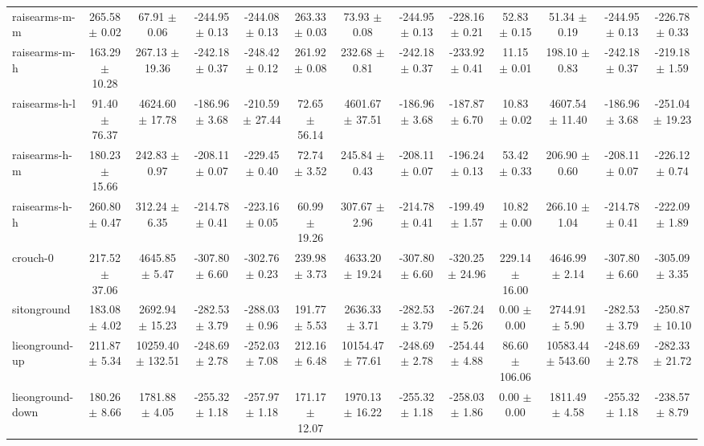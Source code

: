 \begin{tabular}{|lcccccccccccc|}
raisearms-m-m & 265.58 $\pm$ 0.02 & 67.91 $\pm$ 0.06 & -244.95 $\pm$ 0.13 & -244.08 $\pm$ 0.13 & 263.33 $\pm$ 0.03 & 73.93 $\pm$ 0.08 & -244.95 $\pm$ 0.13 & -228.16 $\pm$ 0.21 & 52.83 $\pm$ 0.15 & 51.34 $\pm$ 0.19 & -244.95 $\pm$ 0.13 & -226.78 $\pm$ 0.33 \\
raisearms-m-h & 163.29 $\pm$ 10.28 & 267.13 $\pm$ 19.36 & -242.18 $\pm$ 0.37 & -248.42 $\pm$ 0.12 & 261.92 $\pm$ 0.08 & 232.68 $\pm$ 0.81 & -242.18 $\pm$ 0.37 & -233.92 $\pm$ 0.41 & 11.15 $\pm$ 0.01 & 198.10 $\pm$ 0.83 & -242.18 $\pm$ 0.37 & -219.18 $\pm$ 1.59 \\
raisearms-h-l & 91.40 $\pm$ 76.37 & 4624.60 $\pm$ 17.78 & -186.96 $\pm$ 3.68 & -210.59 $\pm$ 27.44 & 72.65 $\pm$ 56.14 & 4601.67 $\pm$ 37.51 & -186.96 $\pm$ 3.68 & -187.87 $\pm$ 6.70 & 10.83 $\pm$ 0.02 & 4607.54 $\pm$ 11.40 & -186.96 $\pm$ 3.68 & -251.04 $\pm$ 19.23 \\
raisearms-h-m & 180.23 $\pm$ 15.66 & 242.83 $\pm$ 0.97 & -208.11 $\pm$ 0.07 & -229.45 $\pm$ 0.40 & 72.74 $\pm$ 3.52 & 245.84 $\pm$ 0.43 & -208.11 $\pm$ 0.07 & -196.24 $\pm$ 0.13 & 53.42 $\pm$ 0.33 & 206.90 $\pm$ 0.60 & -208.11 $\pm$ 0.07 & -226.12 $\pm$ 0.74 \\
raisearms-h-h & 260.80 $\pm$ 0.47 & 312.24 $\pm$ 6.35 & -214.78 $\pm$ 0.41 & -223.16 $\pm$ 0.05 & 60.99 $\pm$ 19.26 & 307.67 $\pm$ 2.96 & -214.78 $\pm$ 0.41 & -199.49 $\pm$ 1.57 & 10.82 $\pm$ 0.00 & 266.10 $\pm$ 1.04 & -214.78 $\pm$ 0.41 & -222.09 $\pm$ 1.89 \\
crouch-0 & 217.52 $\pm$ 37.06 & 4645.85 $\pm$ 5.47 & -307.80 $\pm$ 6.60 & -302.76 $\pm$ 0.23 & 239.98 $\pm$ 3.73 & 4633.20 $\pm$ 19.24 & -307.80 $\pm$ 6.60 & -320.25 $\pm$ 24.96 & 229.14 $\pm$ 16.00 & 4646.99 $\pm$ 2.14 & -307.80 $\pm$ 6.60 & -305.09 $\pm$ 3.35 \\
sitonground & 183.08 $\pm$ 4.02 & 2692.94 $\pm$ 15.23 & -282.53 $\pm$ 3.79 & -288.03 $\pm$ 0.96 & 191.77 $\pm$ 5.53 & 2636.33 $\pm$ 3.71 & -282.53 $\pm$ 3.79 & -267.24 $\pm$ 5.26 & 0.00 $\pm$ 0.00 & 2744.91 $\pm$ 5.90 & -282.53 $\pm$ 3.79 & -250.87 $\pm$ 10.10 \\
lieonground-up & 211.87 $\pm$ 5.34 & 10259.40 $\pm$ 132.51 & -248.69 $\pm$ 2.78 & -252.03 $\pm$ 7.08 & 212.16 $\pm$ 6.48 & 10154.47 $\pm$ 77.61 & -248.69 $\pm$ 2.78 & -254.44 $\pm$ 4.88 & 86.60 $\pm$ 106.06 & 10583.44 $\pm$ 543.60 & -248.69 $\pm$ 2.78 & -282.33 $\pm$ 21.72 \\
lieonground-down & 180.26 $\pm$ 8.66 & 1781.88 $\pm$ 4.05 & -255.32 $\pm$ 1.18 & -257.97 $\pm$ 1.18 & 171.17 $\pm$ 12.07 & 1970.13 $\pm$ 16.22 & -255.32 $\pm$ 1.18 & -258.03 $\pm$ 1.86 & 0.00 $\pm$ 0.00 & 1811.49 $\pm$ 4.58 & -255.32 $\pm$ 1.18 & -238.57 $\pm$ 8.79 \\

\end{tabular}
